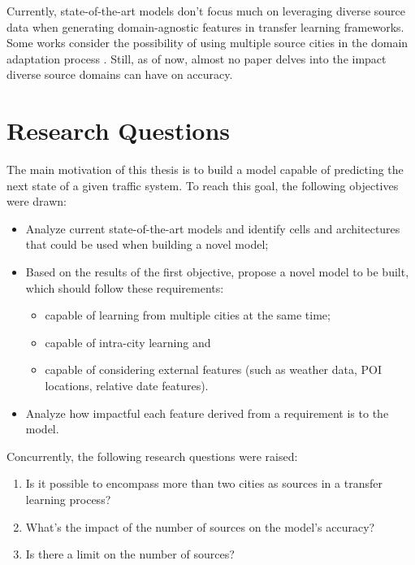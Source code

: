 Currently, state-of-the-art models don't focus much on leveraging diverse source data when generating domain-agnostic features in transfer learning frameworks. Some works consider the possibility of using multiple source cities in the domain adaptation process \cite{Yao2019, Lu2022, Tang2022}. Still, as of now, almost no paper delves into the impact diverse source domains can have on accuracy.

\section{Research Questions}

The main motivation of this thesis is to build a model capable of predicting the next state of a given traffic system. To reach this goal, the following objectives were drawn:

\begin{itemize}
	\item Analyze current state-of-the-art models and identify cells and architectures that could be used when building a novel model;
	\item Based on the results of the first objective, propose a novel model to be built, which should follow these requirements:
		\begin{itemize}
			\item capable of learning from multiple cities at the same time;
			\item capable of intra-city learning and
			\item capable of considering external features (such as weather data, \gls{POI} locations, relative date features).
		\end{itemize}
	\item Analyze how impactful each feature derived from a requirement is to the model.
\end{itemize}

Concurrently, the following research questions were raised:

\begin{enumerate}[label=\textbf{Q.\arabic*}]
\item \label{q1} Is it possible to encompass more than two cities as sources in a transfer learning process?
\item \label{q2} What's the impact of the number of sources on the model's accuracy?
\item \label{q3} Is there a limit on the number of sources?
\end{enumerate}

